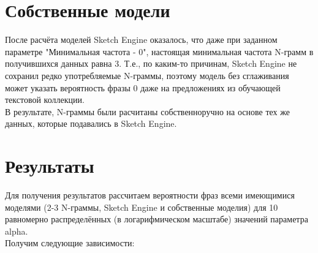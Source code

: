\documentclass[a4paper,12pt]{article}
\begin{document}
\section{Собственные модели}
После расчёта моделей Sketch Engine оказалось, что даже при заданном параметре "Минимальная частота - 0", настоящая минимальная частота N-грамм в получившихся данных равна 3. Т.е., по каким-то причинам, Sketch Engine не сохранил редко употребляемые N-граммы, поэтому модель без сглаживания может указать вероятность фразы 0 даже на предложениях из обучающей текстовой коллекции.\\
В результате, N-граммы были расчитаны собственноручно на основе тех же данных, которые подавались в Sketch Engine.


\section{Результаты}
Для получения результатов рассчитаем вероятности фраз всеми имеющимися моделями (2-3 N-граммы, Sketch Engine и собственные моделия) для 10 равномерно распределённых (в логарифмическом масштабе) значений параметра alpha.\\
Получим следующие зависимости:
\end{document}
